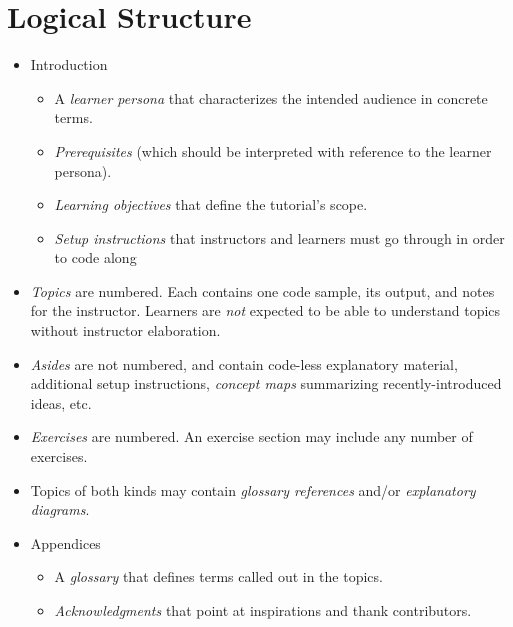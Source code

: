 \documentclass[krantzl]{krantz}
\begin{document}
\section{Logical Structure}
\begin{itemize}
\item 

Introduction

\begin{itemize}
\item A \emph{learner persona} that characterizes the intended audience in concrete terms.

\item \emph{Prerequisites} (which should be interpreted with reference to the learner persona).

\item \emph{Learning objectives} that define the tutorial’s scope.

\item \emph{Setup instructions} that instructors and learners must go through in order to code along

\end{itemize}


\item 

\emph{Topics} are numbered.
    Each contains one code sample, its output, and notes for the instructor.
    Learners are \emph{not} expected to be able to understand topics without instructor elaboration.



\item 

\emph{Asides} are not numbered,
    and contain code-less explanatory material,
    additional setup instructions,
    \emph{concept maps} summarizing recently-introduced ideas,
    etc.



\item 

\emph{Exercises} are numbered.
    An exercise section may include any number of exercises.



\item 

Topics of both kinds may contain \emph{glossary references}
    and/or \emph{explanatory diagrams}.



\item 

Appendices

\begin{itemize}
\item A \emph{glossary} that defines terms called out in the topics.

\item \emph{Acknowledgments} that point at inspirations and thank contributors.

\end{itemize}


\end{itemize}
\end{document}
